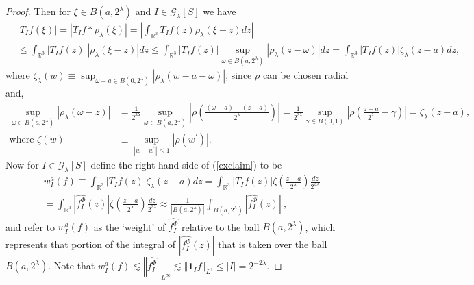 \documentclass{amsart}%
\theoremstyle{plain}
\numberwithin{equation}{section}
\begin{document}
\begin{proof}
Then for $\xi\in B\left(  a,2^{\lambda}\right)  $ and $I\in\mathcal{G}%
_{\lambda}\left[  S\right]  $ we have
\begin{align}
&  \left\vert T_{I}f\left(  \xi\right)  \right\vert =\left\vert T_{I}f\ast
\rho_{\lambda}\left(  \xi\right)  \right\vert =\left\vert \int_{\mathbb{R}%
^{3}}T_{I}f\left(  z\right)  \rho_{\lambda}\left(  \xi-z\right)  dz\right\vert
\label{exclaim}\\
&  \leq\int_{\mathbb{R}^{3}}\left\vert T_{I}f\left(  z\right)  \right\vert
\left\vert \rho_{\lambda}\left(  \xi-z\right)  \right\vert dz\leq
\int_{\mathbb{R}^{3}}\left\vert T_{I}f\left(  z\right)  \right\vert
\sup_{\omega\in B\left(  a,2^{\lambda}\right)  }\left\vert \rho_{\lambda
}\left(  z-\omega\right)  \right\vert dz=\int_{\mathbb{R}^{3}}\left\vert
T_{I}f\left(  z\right)  \right\vert \zeta_{\lambda}\left(  z-a\right)
dz,\nonumber
\end{align}
where $\zeta_{\lambda}\left(  w\right)  \equiv\sup_{\omega-a\in B\left(
0,2^{\lambda}\right)  }\left\vert \rho_{\lambda}\left(  w-a-\omega\right)
\right\vert $, since $\rho$ can be chosen radial and,
\begin{align*}
\sup_{\omega\in B\left(  a,2^{\lambda}\right)  }\left\vert \rho_{\lambda
}\left(  \omega-z\right)  \right\vert  &  =\frac{1}{2^{3\lambda}}\sup
_{\omega\in B\left(  a,2^{\lambda}\right)  }\left\vert \rho\left(
\frac{\left(  \omega-a\right)  -\left(  z-a\right)  }{2^{\lambda}}\right)
\right\vert =\frac{1}{2^{3\lambda}}\sup_{\gamma\in B\left(  0,1\right)
}\left\vert \rho\left(  \frac{z-a}{2^{\lambda}}-\gamma\right)  \right\vert
=\zeta_{\lambda}\left(  z-a\right)  ,\\
\text{where }\zeta\left(  w\right)   &  \equiv\sup_{\left\vert w-w^{\prime
}\right\vert \leq1}\left\vert \rho\left(  w^{\prime}\right)  \right\vert .
\end{align*}
Now for $I\in\mathcal{G}_{\lambda}\left[  S\right]  $ define the right hand
side of (\ref{exclaim}) to be
\begin{align*}
&  w_{I}^{a}\left(  f\right)  \equiv\int_{\mathbb{R}^{3}}\left\vert
T_{I}f\left(  z\right)  \right\vert \zeta_{\lambda}\left(  z-a\right)
dz=\int_{\mathbb{R}^{3}}\left\vert T_{I}f\left(  z\right)  \right\vert
\zeta\left(  \frac{z-a}{2^{\lambda}}\right)  \frac{dz}{2^{3\lambda}}\\
&  =\int_{\mathbb{R}^{3}}\left\vert \widehat{f_{I}^{\Phi}}\left(  z\right)
\right\vert \zeta\left(  \frac{z-a}{2^{\lambda}}\right)  \frac{dz}%
{2^{3\lambda}}\approx\frac{1}{\left\vert B\left(  a,2^{\lambda}\right)
\right\vert }\int_{B\left(  a,2^{\lambda}\right)  }\left\vert \widehat
{f_{I}^{\Phi}}\left(  z\right)  \right\vert \ ,
\end{align*}
and refer to $w_{I}^{a}\left(  f\right)  $ as the `weight' of $\widehat
{f_{I}^{\Phi}}$ relative to the ball $B\left(  a,2^{\lambda}\right)  $, which
represents that portion of the integral of $\left\vert \widehat{f_{I}^{\Phi}%
}\left(  z\right)  \right\vert $ that is taken over the ball $B\left(
a,2^{\lambda}\right)  $. Note that $w_{I}^{a}\left(  f\right)  \lesssim
\left\Vert \widehat{f_{I}^{\Phi}}\right\Vert _{L^{\infty}}\lesssim\left\Vert
\mathbf{1}_{I}f\right\Vert _{L^{1}}\leq\left\vert I\right\vert =2^{-2\lambda}$.


\end{proof}
\end{document}
